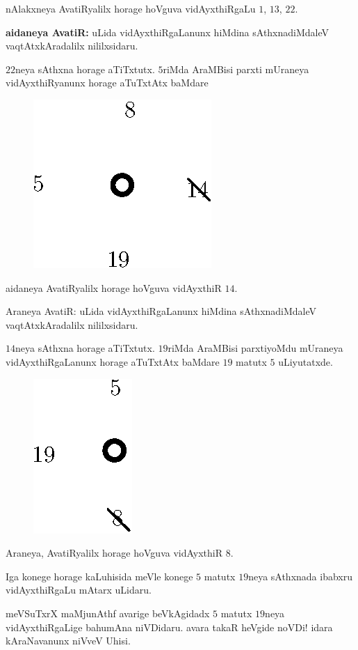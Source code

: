 nAlakxneya AvatiRyalilx horage hoVguva vidAyxthiRgaLu $1$, $13$, $22$.

{\bf aidaneya AvatiR:} uLida vidAyxthiRgaLanunx hiMdina sAthxnadiMdaleV vaqtAtxkAradalilx nililxsidaru.

$22$neya sAthxna horage aTiTxtutx. $5$riMda AraMBisi parxti mUraneya vidAyxthiRyanunx horage aTuTxtAtx baMdare
\begin{figure}[H]
\centering
\includegraphics[scale=0.8]{src/figures/fig13.eps}
\end{figure}

aidaneya AvatiRyalilx horage hoVguva vidAyxthiR $14$.

Araneya AvatiR: uLida vidAyxthiRgaLanunx hiMdina sAthxnadiMdaleV vaqtAtxkAradalilx nililxsidaru.

$14$neya sAthxna horage aTiTxtutx. $19$riMda AraMBisi parxtiyoMdu mUraneya vidAyxthiRgaLanunx horage aTuTxtAtx baMdare $19$ matutx $5$ uLiyutatxde. 
\begin{figure}[H]
\centering
\includegraphics[scale=0.8]{src/figures/fig14.eps}
\end{figure}

Araneya, AvatiRyalilx horage hoVguva vidAyxthiR $8$.

Iga konege horage kaLuhisida meVle konege $5$ matutx $19$neya sAthxnada ibabxru vidAyxthiRgaLu mAtarx uLidaru.

meVSuTxrX maMjunAthf avarige beVkAgidadx $5$ matutx $19$neya vidAyxthiRgaLige bahumAna niVDidaru. avara takaR heVgide noVDi! idara kAraNavanunx niVveV Uhisi.
